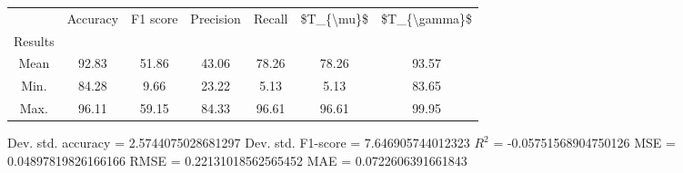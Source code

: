 \begin{tabular}{|c|c|c|c|c|c|c|}
\toprule
{} &  Accuracy &  F1 score &  Precision &  Recall &  \$T\_\{\textbackslash mu\}\$ &  \$T\_\{\textbackslash gamma\}\$ \\
Results &           &           &            &         &            &               \\
\hline
Mean    &     92.83 &     51.86 &      43.06 &   78.26 &      78.26 &         93.57 \\
Min.    &     84.28 &      9.66 &      23.22 &    5.13 &       5.13 &         83.65 \\
Max.    &     96.11 &     59.15 &      84.33 &   96.61 &      96.61 &         99.95 \\
\bottomrule
\end{tabular}

 Dev. std. accuracy = 2.5744075028681297
 Dev. std. F1-score = 7.646905744012323
 $R^2$ = -0.05751568904750126
 MSE = 0.04897819826166166
 RMSE = 0.22131018562565452
 MAE = 0.0722606391661843
